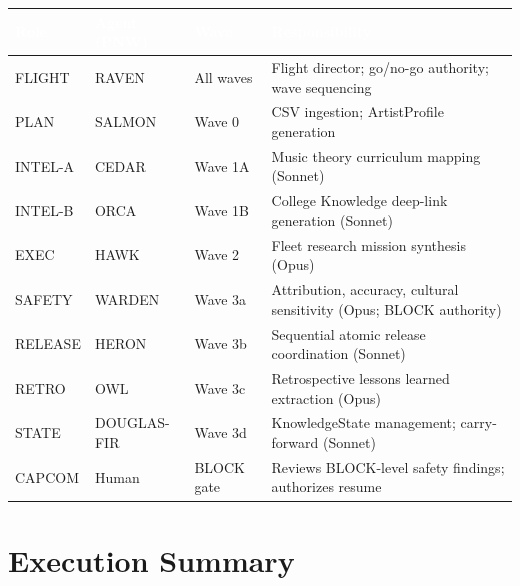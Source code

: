 \documentclass[11pt,letterpaper]{article}
\newcommand{\tblhdr}[1]{\textbf{\sffamily\textcolor{white}{#1}}}
\begin{document}
\begin{center}
\begin{tabularx}{\textwidth}{L{3cm}L{2.5cm}L{2.2cm}X}
\toprule
{}
\tblhdr{Role} & \tblhdr{Agent (PNW)} & \tblhdr{Wave} & \tblhdr{Responsibility} \\
\midrule
FLIGHT & RAVEN & All waves & Flight director; go/no-go authority; wave sequencing \\
PLAN & SALMON & Wave 0 & CSV ingestion; ArtistProfile generation \\
INTEL-A & CEDAR & Wave 1A & Music theory curriculum mapping (Sonnet) \\
INTEL-B & ORCA & Wave 1B & College Knowledge deep-link generation (Sonnet) \\
EXEC & HAWK & Wave 2 & Fleet research mission synthesis (Opus) \\
SAFETY & WARDEN & Wave 3a & Attribution, accuracy, cultural sensitivity (Opus; BLOCK authority) \\
RELEASE & HERON & Wave 3b & Sequential atomic release coordination (Sonnet) \\
RETRO & OWL & Wave 3c & Retrospective lessons learned extraction (Opus) \\
STATE & DOUGLAS-FIR & Wave 3d & KnowledgeState management; carry-forward (Sonnet) \\
CAPCOM & Human & BLOCK gate & Reviews BLOCK-level safety findings; authorizes resume \\
\bottomrule
\end{tabularx}
\end{center}

\section{Execution Summary}
\end{document}

